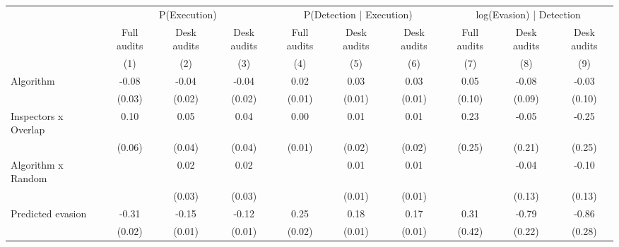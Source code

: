 \begin{tabular}{lccc|ccc|ccc} \toprule
\multicolumn{1}{l}{} & \multicolumn{3}{c}{P(Execution)} & \multicolumn{3}{c}{P(Detection | Execution)} & \multicolumn{3}{c}{log(Evasion) | Detection} \\\cmidrule(lr){2-4}\cmidrule(lr){5-7}\cmidrule(lr){8-10} \multicolumn{1}{l}{} & Full audits & Desk audits & Desk audits & Full audits & Desk audits & Desk audits & Full audits & Desk audits & Desk audits \\ \multicolumn{1}{l}{} & (1) & (2) & (3) & (4) & (5) & (6) & (7) & (8) & (9) \\ \midrule
Algorithm   &       -0.08\sym{***}&       -0.04\sym{***}&       -0.04\sym{**} &        0.02\sym{**} &        0.03\sym{***}&        0.03\sym{***}&        0.05         &       -0.08         &       -0.03         \\
            &      (0.03)         &      (0.02)         &      (0.02)         &      (0.01)         &      (0.01)         &      (0.01)         &      (0.10)         &      (0.09)         &      (0.10)         \\
\addlinespace
Inspectors x Overlap&        0.10         &        0.05         &        0.04         &        0.00         &        0.01         &        0.01         &        0.23         &       -0.05         &       -0.25         \\
            &      (0.06)         &      (0.04)         &      (0.04)         &      (0.01)         &      (0.02)         &      (0.02)         &      (0.25)         &      (0.21)         &      (0.25)         \\
\addlinespace
Algorithm x Random&                     &        0.02         &        0.02         &                     &        0.01         &        0.01         &                     &       -0.04         &       -0.10         \\
            &                     &      (0.03)         &      (0.03)         &                     &      (0.01)         &      (0.01)         &                     &      (0.13)         &      (0.13)         \\
\addlinespace
Predicted evasion&       -0.31\sym{***}&       -0.15\sym{***}&       -0.12\sym{***}&        0.25\sym{***}&        0.18\sym{***}&        0.17\sym{***}&        0.31         &       -0.79\sym{***}&       -0.86\sym{***}\\
            &      (0.02)         &      (0.01)         &      (0.01)         &      (0.02)         &      (0.01)         &      (0.01)         &      (0.42)         &      (0.22)         &      (0.28)         \\

\end{tabular}
